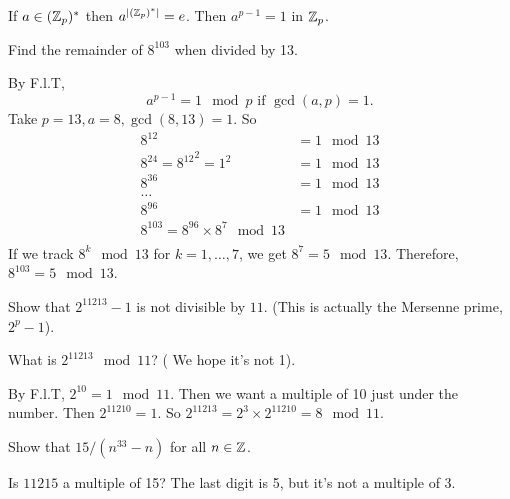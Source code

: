 \documentclass[class=article,crop=false]{standalone}
\begin{document}
\begin{prf}
	If $ a \in (\mathbb{Z}_p)^* $ then $ a^{|(\mathbb{Z}_p)^* |} = e$. Then $ a^{p-1}=1$ in $ \mathbb{Z}_p$.
\end{prf}

\begin{eg}[]
Find the remainder of $ 8^{103}$ when divided by 13.

By F.l.T,
\[
	a^{p-1}=1 \mod p \text{ if } \gcd ( a,p)=1  
.\] 
Take $ p=13, a=8, \gcd ( 8,13)=1 $. So 
\begin{align*}
	8^{12}&= 1 \mod 13 \\
	8^{24} = {8^{12}}^2 = 1^2 &=1 \mod 13 \\
	8^{36} &= 1 \mod 13 \\
	\ldots&\\
	8^{96} &= 1 \mod 13\\
	8^{103} = 8^{96} \times 8^{7} \mod 13\\
\end{align*}
If we track $ 8^{k} \mod 13$ for $ k=1,\ldots,7$, we get $ 8^{7}= 5 \mod 13$. Therefore, $ 8^{103} = 5 \mod 13$.
\end{eg}

\begin{eg}[]
	Show that $ 2^{11213}-1$ is not divisible by $ 11$. (This is actually the Mersenne prime, $ 2^{p}-1$). 

	What is $ 2^{11213} \mod 11$? ( We hope it's not 1).

	By F.l.T, $ 2^{10}=1 \mod 11$. Then we want a multiple of 10 just under the number. Then $ 2^{11210}=1$. So $ 2^{11213}= 2^{3}\times 2^{11210}=8 \mod 11$.
\end{eg}

\begin{eg}[]
	Show that $ 15 /(n^{33}-n)$ for all $ n \in \mathbb{Z}$. 

	Is $ 11215$ a multiple of 15? The last digit is 5, but it's not a multiple of 3. 
\end{eg}
\end{document}
